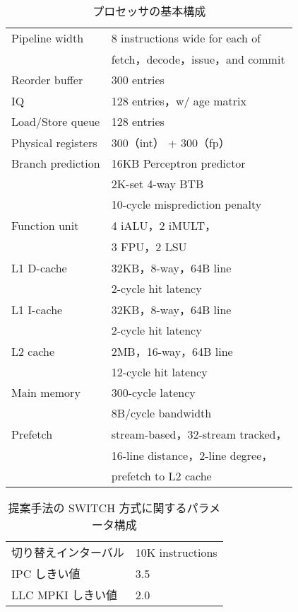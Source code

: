 \begin{table}[htb]
  \caption{プロセッサの基本構成}
  \footnotesize
  \center
    \begin{tabular}{l|l} \hline \hline
     Pipeline width & 8 instructions wide for each of \\
     & fetch，decode，issue，and commit \\
     Reorder buffer & 300 entries \\
     IQ & 128 entries，w/ age matrix \\
     Load/Store queue & 128 entries \\
     Physical registers & 300（int） + 300（fp） \\
     Branch prediction & 16KB Perceptron predictor~\cite{Jimenez2001} \\
     & 2K-set 4-way BTB \\
     & 10-cycle misprediction penalty \\
     Function unit & 4 iALU，2 iMULT，\\
     &  3 FPU，2 LSU \\
     L1 D-cache & 32KB，8-way，64B line \\
      & 2-cycle hit latency \\
     L1 I-cache & 32KB，8-way，64B line \\
      &  2-cycle hit latency \\
     L2 cache & 2MB，16-way，64B line \\
      & 12-cycle hit latency \\  
     Main memory & 300-cycle latency \\
     & 8B/cycle bandwidth \\ 
     Prefetch & stream-based，32-stream tracked， \\ 
     & 16-line distance，2-line degree，\\
     & prefetch to L2 cache \\ \hline
  \end{tabular}
  \label{tab:base_config}
\end{table}

\begin{table}[tb]
  \caption{提案手法の SWITCH 方式に関するパラメータ構成}
  \footnotesize
  \center
    \begin{tabular}{l|l} \hline \hline
    切り替えインターバル & 10K instructions \\
    IPC しきい値 & 3.5 \\
    LLC MPKI しきい値 & 2.0 \\ \hline 
  \end{tabular}
  \label{tab:switch_config}
\end{table}

